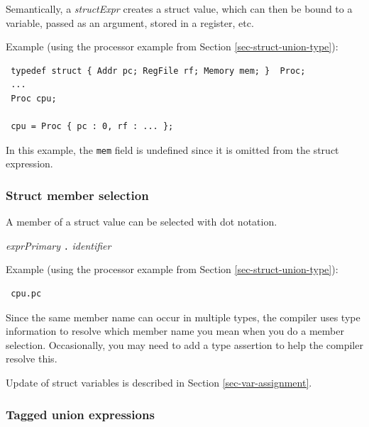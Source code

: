 \documentclass[twoside,letterpaper]{article}
\newcommand{\hm}{\hspace*{1em}}
\newcommand{\nterm}[1]{\emph{#1}}
\newcommand{\term}[1]{\texttt{#1}}
\newcommand{\gram}[2]{    \hm\makebox[10em][l]{\it #1}\makebox[1.5em][l]{::=}    #2}
\begin{document}

Semantically, a \nterm{structExpr} creates a struct value, which can
then be bound to a variable, passed as an argument, stored in a
register, etc.

Example (using the processor example from Section \ref{sec-struct-union-type}):
\begin{verbatim}
 typedef struct { Addr pc; RegFile rf; Memory mem; }  Proc;
 ...
 Proc cpu;

 cpu = Proc { pc : 0, rf : ... };
\end{verbatim}
In this example, the \texttt{mem} field is undefined since it is omitted
from the struct expression.


\subsubsection{Struct member selection}

\label{sec-struct-select}

A member of a struct value can be selected with dot notation.

\gram{exprPrimary}{ \nterm{exprPrimary} \term{.} \nterm{identifier} }

Example (using the processor example from Section \ref{sec-struct-union-type}):
\begin{verbatim}
 cpu.pc
\end{verbatim}

Since the same member name can occur in multiple types, the compiler
uses type information to resolve which member name you mean when you
do a member selection.  Occasionally, you may need to add a type
assertion to help the compiler resolve this.

Update of struct variables is described in Section
{\ref{sec-var-assignment}}.


\subsubsection{Tagged union expressions}
\end{document}
